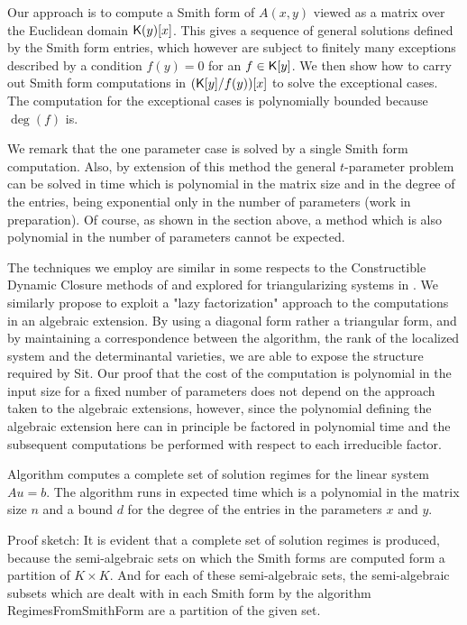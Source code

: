 \documentclass[10pt]{article}
\begin{document}
Our approach is to compute a Smith form of $A(x,y)$ viewed as a matrix
over the Euclidean domain ${\mathsf K}(y)[x]$.  This gives a sequence of
general solutions defined by the Smith form entries, which however are
subject to finitely many exceptions described by a condition 
$f(y) = 0$ for an $f\in{\mathsf K}[y]$.  We then show how to carry out Smith form
computations in $({\mathsf K}[y]/f(y))[x]$ to solve the exceptional cases.  
The computation for the exceptional cases is 
polynomially bounded because $\deg(f)$ is. 

We remark that the one parameter case is solved by a single Smith form
computation.  
Also, by extension of this method the general $t$-parameter problem can be solved in 
time which is polynomial in the matrix size and in the degree of the entries,
being exponential only in the number of parameters (work in preparation).
Of course, as shown in the section above, a method which is also polynomial 
in the number of parameters cannot be expected. 

The techniques we employ are similar in some respects to the
Constructible Dynamic Closure methods of \cite{Duv} and
explored for triangularizing systems in \cite{Gom}.  We similarly propose 
to exploit 
a "lazy factorization" approach to the computations in an algebraic 
extension.  By using a
diagonal form rather a triangular form, and by maintaining a
correspondence between the algorithm, the rank of the localized system
and the determinantal varieties, we are able to expose the structure
required by Sit.  Our proof that the cost of the
computation is polynomial in the input size for a fixed number of
parameters does not depend on the approach taken to the algebraic extensions,
however, since the polynomial defining the algebraic extension here can 
in principle be factored in polynomial time and the subsequent computations be 
performed with respect to each irreducible factor.

\begin{theorem}
Algorithm \StPLS computes a complete set of solution regimes for the linear
system $Au = b$.  
The algorithm runs in expected time which is a polynomial in the matrix size $n$
and a bound $d$ for the degree of the entries in the parameters $x$ and $y$.
\end{theorem}

Proof sketch:
It is evident that a complete set of solution regimes is produced, 
because the semi-algebraic sets on which the Smith forms are computed form 
a partition of $K\times K$.  And for each of these semi-algebraic sets, 
the semi-algebraic subsets which are dealt with in each Smith form 
by the algorithm RegimesFromSmithForm are a partition of the given set.
\end{document}
